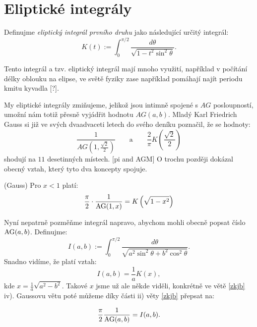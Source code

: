 \documentclass[12pt]{report}
\begin{document}
\section{Eliptické integrály}

\begin{definice}
Definujme \textit{eliptický integrál prvního druhu} jako následující určitý integrál:
\begin{equation*}
K(t) := \int_{0}^{\pi/2} \frac{d \theta}{\sqrt{1 - t^2 \sin^2 \theta}}.
\end{equation*}
\end{definice}

Tento integrál a tzv. eliptický integrál  mají mnoho využití, například v počítání délky oblouku na elipse, ve světě fyziky zase například pomáhají najít periodu kmitu kyvadla [?].

My eliptické integrály zmiňujeme, jelikož jsou intimně spojené s $AG$ posloupností, umožní nám totiž přesně vyjádřit hodnotu $AG(a,b)$. Mladý Karl Friedrich Gauss si již ve svých dvaadvaceti letech do svého deníku poznačil, že se hodnoty:
$$\frac{1}{AG\left(1,\frac{\sqrt{2}}{2}\right)} \qquad  \text{a} \qquad \frac{2}{\pi} K\left(\frac{\sqrt{2}}{2} \right)$$
shodují na $11$ desetinných místech. [pi and AGM] O trochu později dokázal obecný vztah, který tyto dva koncepty spojuje.
\begin{veta} (Gauss)
Pro $x<1$ platí:
\begin{equation}\label{el}
\frac{\pi}{2} \cdot \frac{1}{\operatorname{AG}(1,x)} = K\left(\sqrt{1 - x^2}\right)
\end{equation}
\end{veta}

Nyní nepatrně pozměňme integrál napravo, abychom mohli obecně popsat číslo $\operatorname{AG}(a,b)$. Definujme:
$$I(a,b) := \int_{0}^{\pi/2} \frac{d \theta}{\sqrt{a^2 \sin ^2 \theta + b^2 \cos ^2 \theta}}. $$
Snadno vidíme, že platí vztah:
$$I(a,b) = \frac{1}{a} K(x),$$ kde $x =\frac{1}{a} \sqrt{a^2-b^2}$. Takové $x$ jsme už ale někde viděli, konkrétně ve větě \ref{zkjb} iv). Gaussovu větu poté můžeme díky části ii) věty \ref{zkjb} přepsat na:
\begin{veta}\label{Ia}
$$\frac{\pi}{2} \frac{1}{\operatorname{AG}(a,b)} = I(a,b).$$
\end{veta}
\end{document}
